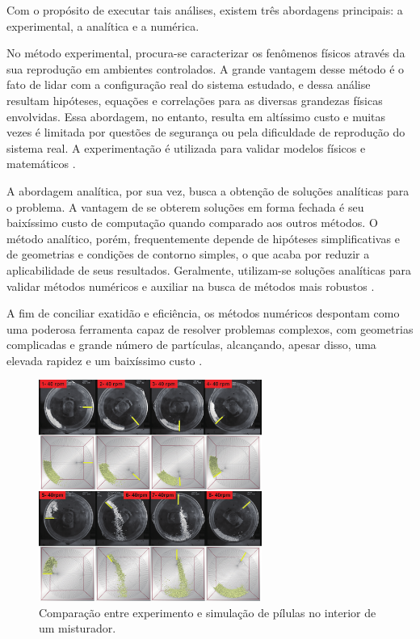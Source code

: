 Com o propósito de executar tais análises, existem três abordagens principais: a experimental, a analítica e a numérica. 

No método experimental, procura-se caracterizar os fenômenos físicos através da sua reprodução em ambientes controlados. A grande vantagem desse método é o fato de lidar com a configuração real do sistema estudado, e dessa análise resultam hipóteses, equações e correlações para as diversas grandezas físicas envolvidas. Essa abordagem, no entanto, resulta em altíssimo custo e muitas vezes é limitada por questões de segurança ou pela dificuldade de reprodução do sistema real. A experimentação é utilizada para validar modelos físicos e matemáticos \cite{bib:maliska}.

A abordagem analítica, por sua vez, busca a obtenção de soluções analíticas para o problema. A vantagem de se obterem soluções em forma fechada é seu baixíssimo custo de computação quando comparado aos outros métodos. O método analítico, porém, frequentemente depende de hipóteses simplificativas e de geometrias e condições de contorno simples, o que acaba por reduzir a aplicabilidade de seus resultados. Geralmente, utilizam-se soluções analíticas para validar métodos numéricos e auxiliar na busca de métodos mais robustos \cite{bib:maliska}.

A fim de conciliar exatidão e eficiência, os métodos numéricos despontam como uma poderosa ferramenta capaz de resolver problemas complexos, com geometrias complicadas e grande número de partículas, alcançando, apesar disso, uma elevada rapidez e um baixíssimo custo \cite{bib:maliska}.

\begin{figure}[h]
	\caption{Comparação entre experimento e simulação de pílulas no interior de um misturador.}
	\vspace{-0.5cm}
	\begin{center}
		\includegraphics[width=0.65\textwidth]{images/introduction/pellet_flow.png}
	\end{center}
	\vspace{-0.2cm}
	\label{fig:pellet_flow}
\end{figure}

